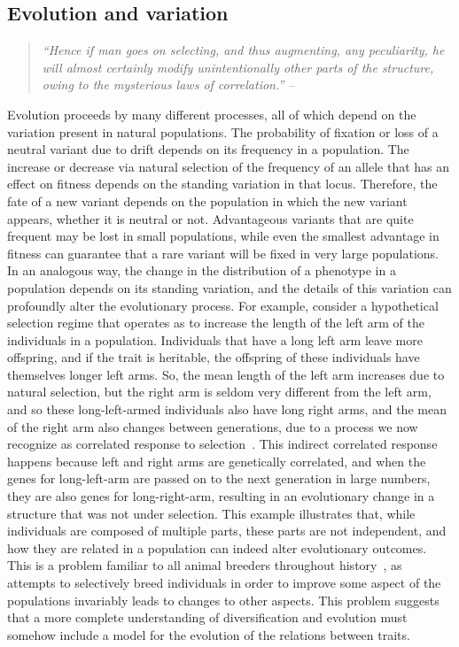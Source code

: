 \begin{refsection}

\section{Evolution and variation}\label{evolution-and-variation}

\begin{quote}
\textit{``Hence if man goes on selecting, and thus augmenting, any peculiarity,
he will almost certainly modify unintentionally other parts of the
structure, owing to the mysterious laws of correlation.'' --
\textbf{\textcite{Darwin1872}}}
\end{quote}

Evolution proceeds by many different processes, all of which depend on
the variation present in natural populations. The probability of
fixation or loss of a neutral variant due to drift depends on its
frequency in a population. The increase or decrease via natural
selection of the frequency of an allele that has an effect on fitness
depends on the standing variation in that locus. Therefore, the fate of
a new variant depends on the population in which the new variant
appears, whether it is neutral or not. Advantageous variants that are
quite frequent may be lost in small populations, while even the smallest
advantage in fitness can guarantee that a rare variant will be fixed in
very large populations. In an analogous way, the change in the
distribution of a phenotype in a population depends on its standing
variation, and the details of this variation can profoundly alter the
evolutionary process. For example, consider a hypothetical selection
regime that operates as to increase the length of the left arm of the
individuals in a population. Individuals that have a long left arm leave
more offspring, and if the trait is heritable, the offspring of these
individuals have themselves longer left arms. So, the mean length of the
left arm increases due to natural selection, but the right arm is seldom
very different from the left arm, and so these long-left-armed
individuals also have long right arms, and the mean of the right arm
also changes between generations, due to a process we now recognize as
correlated response to selection~\parencite{Lande1983-ez}. This indirect
correlated response happens because left and right arms are genetically
correlated, and when the genes for long-left-arm are passed on to the
next generation in large numbers, they are also genes for
long-right-arm, resulting in an evolutionary change in a structure that
was not under selection. This example illustrates that, while
individuals are composed of multiple parts, these parts are not
independent, and how they are related in a population can indeed alter
evolutionary outcomes. This is a problem familiar to all animal breeders
throughout history~\parencite{Hazel1943-uq}, as attempts to selectively breed
individuals in order to improve some aspect of the populations
invariably leads to changes to other aspects. This problem suggests that
a more complete understanding of diversification and evolution must
somehow include a model for the evolution of the relations between
traits.


\end{refsection}
